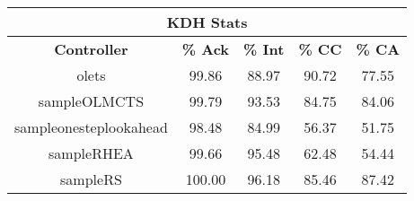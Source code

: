 \begin{table}[h!]
\begin{center}
\begin{adjustbox}{width=0.5\textwidth}
\begin{tabular}{|c|c|c|c|c|}
\hline
\multicolumn{5}{|c|}{\textbf{KDH Stats}}\\
\hline\hline
\textbf{Controller} & \textbf{\% Ack} & \textbf{\% Int} & \textbf{\% CC} & \textbf{\% CA}\\
\hline
\hline
olets & 99.86 & 88.97 & 90.72 & 77.55
 \\
\hline
sampleOLMCTS & 99.79 & 93.53 & 84.75 & 84.06
 \\
\hline
sampleonesteplookahead & 98.48 & 84.99 & 56.37 & 51.75
 \\
\hline
sampleRHEA & 99.66 & 95.48 & 62.48 & 54.44
 \\
\hline
sampleRS & 100.00 & 96.18 & 85.46 & 87.42
 \\
\hline
\end{tabular}
\end{adjustbox}
\caption{}
\label{table:stats_KDH}
\end{center}
\end{table}
